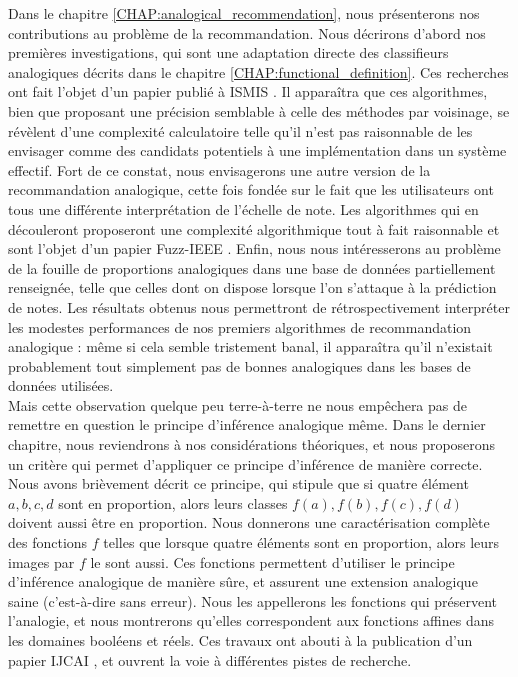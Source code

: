 Dans le chapitre \ref{CHAP:analogical_recommendation}, nous présenterons nos
contributions au problème de la recommandation. Nous décrirons d'abord nos
premières investigations, qui sont une adaptation directe des classifieurs
analogiques décrits dans le chapitre \ref{CHAP:functional_definition}. Ces
recherches ont fait l'objet d'un papier publié à ISMIS \cite{HugPraRicISMIS15}.
Il apparaîtra que ces algorithmes, bien que proposant une précision semblable à
celle des méthodes par voisinage, se révèlent d'une complexité calculatoire
telle qu'il n'est pas raisonnable de les envisager comme des candidats
potentiels à une implémentation dans un système effectif. Fort de ce constat,
nous envisagerons une autre version de la recommandation analogique, cette fois
fondée sur le fait que les utilisateurs ont tous une différente interprétation
de l'échelle de note. Les algorithmes qui en découleront proposeront une
complexité algorithmique tout à fait raisonnable et sont l'objet d'un papier
Fuzz-IEEE  \cite{HugPraRicSerFuzzIEEE16}. Enfin, nous nous intéresserons au
problème de la fouille de proportions analogiques dans une base de données
partiellement renseignée, telle que celles dont on dispose lorsque l'on
s'attaque à la prédiction de notes. Les résultats obtenus nous permettront de
rétrospectivement interpréter les modestes performances de nos premiers
algorithmes de recommandation analogique : même si cela semble tristement
banal, il apparaîtra qu'il n'existait probablement tout simplement pas de
bonnes analogiques dans les bases de données utilisées.\\


Mais cette observation quelque peu terre-à-terre ne nous empêchera pas de
remettre en question le principe d'inférence analogique même. Dans le dernier
chapitre, nous reviendrons à nos considérations théoriques, et nous proposerons
un critère qui permet d'appliquer ce principe d'inférence de manière correcte.
Nous avons brièvement décrit ce principe, qui stipule que si quatre élément $a,
b, c, d$ sont en proportion, alors leurs classes $f(a), f(b), f(c), f(d)$
doivent aussi être en proportion. Nous donnerons une caractérisation complète
des fonctions $f$ telles que lorsque quatre éléments sont en proportion, alors
leurs images par $f$ le sont aussi. Ces fonctions permettent d'utiliser le
principe d'inférence analogique de manière sûre, et assurent une extension
analogique saine (c'est-à-dire sans erreur). Nous les appellerons les fonctions
qui préservent l'analogie, et nous montrerons qu'elles correspondent aux
fonctions affines dans les domaines booléens et réels. Ces travaux ont
abouti à la publication d'un papier IJCAI \cite{CouHugPraRicIJCAI17}, et
ouvrent la voie à différentes pistes de recherche.

